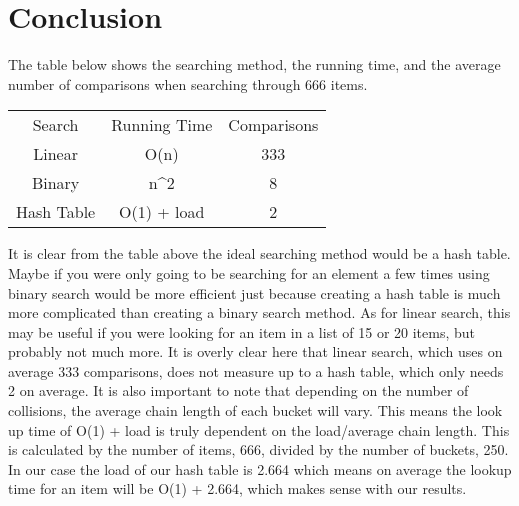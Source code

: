 \documentclass{article}
\begin{document}
\section{Conclusion}
The table below shows the searching method, the running time, and the average number of comparisons when searching through 666 items. 
\begin{center}
\begin{tabular}{ c c c }
 Search & Running Time & Comparisons \\ 
 Linear & O(n) & 333 \\ 
 Binary & n^2 & 8 \\  
 Hash Table & O(1) + load & 2 \\
\end{tabular}
\end{center}
It is clear from the table above the ideal searching method would be a hash table. Maybe if you were only going to be searching for an element a few times using binary search would be more efficient just because creating a hash table is much more complicated than creating a binary search method. As for linear search, this may be useful if you were looking for an item in a list of 15 or 20 items, but probably not much more. It is overly clear here that linear search, which uses on average 333 comparisons, does not measure up to a hash table, which only needs 2 on average. It is also important to note that depending on the number of collisions, the average chain length of each bucket will vary. This means the look up time of O(1) + load is truly dependent on the load/average chain length. This is calculated by the number of items, 666, divided by the number of buckets, 250. In our case the load of our hash table is 2.664 which means on average the lookup time for an item will be O(1) + 2.664, which makes sense with our results. 
\end{document}
